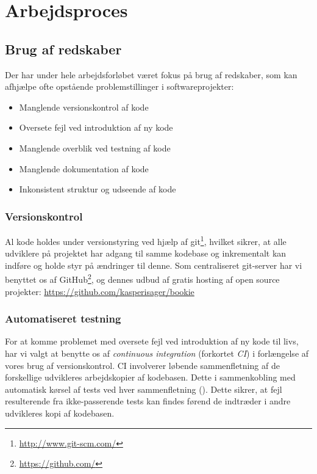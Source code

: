 \chapter{Arbejdsproces}

\section{Brug af redskaber}

Der har under hele arbejdsforløbet været fokus på brug af redskaber, som kan afhjælpe ofte opstående problemstillinger i softwareprojekter:

\begin{itemize}
  \item Manglende versionskontrol af kode
  \item Oversete fejl ved introduktion af ny kode
  \item Manglende overblik ved testning af kode
  \item Manglende dokumentation af kode
  \item Inkonsistent struktur og udseende af kode
\end{itemize}

\subsection{Versionskontrol}

Al kode holdes under versionstyring ved hjælp af git\footnote{\url{http://www.git-scm.com/}}, hvilket sikrer, at alle udviklere på projektet har adgang til samme kodebase og inkrementalt kan indføre og holde styr på ændringer til denne. Som centraliseret git-server har vi benyttet os af GitHub\footnote{\url{https://github.com/}}, og dennes udbud af gratis hosting af open source projekter: \url{https://github.com/kasperisager/bookie}

\subsection{Automatiseret testning}

For at komme problemet med oversete fejl ved introduktion af ny kode til livs, har vi valgt at benytte os af \textit{continuous integration} (forkortet \textit{CI}) i forlængelse af vores brug af versionskontrol. CI involverer løbende sammenfletning af de forskellige udvikleres arbejdskopier af kodebasen. Dette i sammenkobling med automatisk kørsel af tests ved hver sammenfletning (\cite{wiki:ci}). Dette sikrer, at fejl resulterende fra ikke-passerende tests kan findes førend de indtræder i andre udvikleres kopi af kodebasen.

